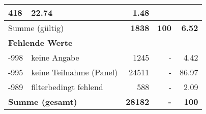 \begin{longtable}{lXrrr}
       \num{418} &
       \num[round-mode=places,round-precision=2]{22,74} &
         \num[round-mode=places,round-precision=2]{1,48} \\
     \midrule
     \multicolumn{2}{l}{Summe (gültig)} &
       \textbf{\num{1838}} &
     \textbf{100} &
       \textbf{\num[round-mode=places,round-precision=2]{6,52}} \\
     \multicolumn{5}{l}{\textbf{Fehlende Werte}}\\
       -998 &
       keine Angabe &
         \num{1245} &
        - &
         \num[round-mode=places,round-precision=2]{4,42} \\
       -995 &
       keine Teilnahme (Panel) &
         \num{24511} &
        - &
         \num[round-mode=places,round-precision=2]{86,97} \\
       -989 &
       filterbedingt fehlend &
         \num{588} &
        - &
         \num[round-mode=places,round-precision=2]{2,09} \\
     \midrule
     \multicolumn{2}{l}{\textbf{Summe (gesamt)}} &
          \textbf{\num{28182}} &
        \textbf{-} &
        \textbf{100} \\
     \bottomrule
     \end{longtable}
     
